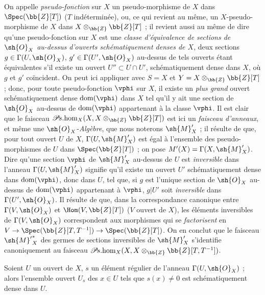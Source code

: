 \begin{env}[20.2.8]
\label{IV.20.2.8}
On appelle \emph{pseudo-fonction} sur $X$ un pseudo-morphisme de $X$ dans $\Spec(\bb{Z}[T])$ ($T$ indéterminée), ou, ce qui revient au même, un $X$-pseudo-morphisme de $X$ dans $X\otimes_{\bb{Z}}\bb{Z}[T]$ ; il revient aussi au même  de dire qu'une pseudo-fonction sur $X$ est une \emph{classe d'équivalence de sections de $\sh{O}_X$ au-dessus d'ouverts schématiquement denses de $X$}, deux sections $g\in\Gamma(U,\sh{O}_X)$, $g'\in\Gamma(U',\sh{O}_X)$ au-dessus de tels ouverts étant équivalentes s'il existe un ouvert $U''\subset U\cap U'$, schématiquement dense dans $X$, où $g$ et $g'$ coïncident.
On peut ici appliquer  avec $S=X$ et $Y=X\otimes_{\bb{Z}}\bb{Z}[T]$ ; donc, pour toute pseudo-fonction $\vphi$ sur $X$, il existe un \emph{plus grand} ouvert schématiquement dense $\operatorname{dom}(\vphi)$ dans $X$ tel qu'il y ait une section de $\sh{O}_X$ au-dessus de $\operatorname{dom}(\vphi)$ appartenant à la classe $\vphi$.
Il est clair que le faisceau $\mathscr{P}\!s.\!\operatorname{hom}_X(X,X\otimes_{\bb{Z}}\bb{Z}[T])$ est ici un \emph{faisceau d'anneaux}, et même une $\sh{O}_X$-\emph{Algèbre}, que nous noterons $\sh{M}'_X$ ; il résulte de  que, pour tout ouvert $U$ de $X$, $\Gamma(U,\sh{M}'_X)$ est égal à l'ensemble des pseudo-morphismes de $U$ dans $\Spec(\bb{Z}[T])$ ; on pose $M'(X)=\Gamma(X,\sh{M}'_X)$.
Dire qu'une section $\vphi$ de $\sh{M}'_X$ au-dessus de $U$ est \emph{inversible} dans l'anneau $\Gamma(U,\sh{M}'_X)$ signifie qu'il existe un ouvert $U'$ schématiquement dense dans $\operatorname{dom}(\vphi)$, donc dans $U$, tel que, si $g$ est l'unique section de $\sh{O}_X$ au-dessus de $\operatorname{dom}(\vphi)$ appartenant à $\vphi$, $g|U'$ soit \emph{inversible} dans $\Gamma(U',\sh{O}_X)$.
Il résulte de  que, dans la correspondance canonique entre $\Gamma(V,\sh{O}_X)$ et $\Hom(V,\bb{Z}[T])$ ($V$ ouvert de $X$), les éléments inversibles de $\Gamma(V,\sh{O}_X)$ correspondent aux morphismes qui se
\emph{factorisent} en $V\to\Spec(\bb{Z}[T,T^{-1}])\to\Spec(\bb{Z}[T])$.
On en conclut que le faisceau ${\sh{M}'}^*_X$ des germes de sections inversibles de $\sh{M}'_X$ s'identifie canoniquement au faisceau $\mathscr{P}\!s.\!\operatorname{hom}_X(X,X\otimes_{\bb{Z}}\bb{Z}[T,T^{-1}])$.
\end{env}

\begin{lemma}[20.2.9]
\label{IV.20.2.9}
Soient $U$ un ouvert de $X$, $s$ un élément régulier de l'anneau $\Gamma(U,\sh{O}_X)$ ; alors l'ensemble ouvert $U_s$ des $x\in U$ tels que $s(x)\neq0$ est schématiquement dense dans $U$.
\end{lemma}

